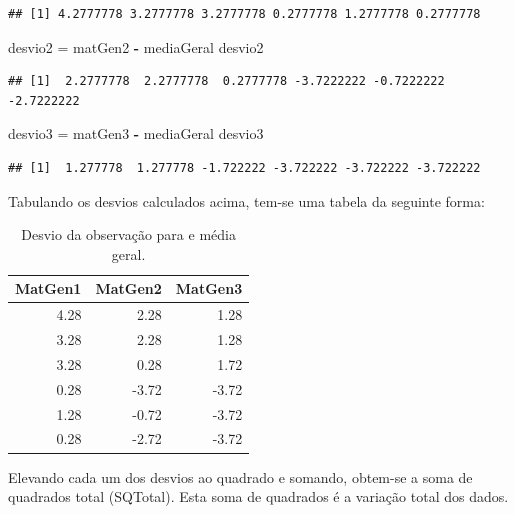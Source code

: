 \documentclass[
]{article}
\newenvironment{Shaded}{\begin{snugshade}}{\end{snugshade}}
\newcommand{\NormalTok}[1]{#1}
\newcommand{\OperatorTok}[1]{\textcolor[rgb]{0.81,0.36,0.00}{\textbf{#1}}}
\newcommand{\StringTok}[1]{\textcolor[rgb]{0.31,0.60,0.02}{#1}}
\begin{document}
\begin{verbatim}
## [1] 4.2777778 3.2777778 3.2777778 0.2777778 1.2777778 0.2777778
\end{verbatim}

\begin{Shaded}
\begin{Highlighting}[]
\NormalTok{desvio2 =}\StringTok{ }\NormalTok{matGen2 }\OperatorTok{-}\StringTok{ }\NormalTok{mediaGeral}
\NormalTok{desvio2}
\end{Highlighting}
\end{Shaded}

\begin{verbatim}
## [1]  2.2777778  2.2777778  0.2777778 -3.7222222 -0.7222222 -2.7222222
\end{verbatim}

\begin{Shaded}
\begin{Highlighting}[]
\NormalTok{desvio3 =}\StringTok{ }\NormalTok{matGen3 }\OperatorTok{-}\StringTok{ }\NormalTok{mediaGeral}
\NormalTok{desvio3}
\end{Highlighting}
\end{Shaded}

\begin{verbatim}
## [1]  1.277778  1.277778 -1.722222 -3.722222 -3.722222 -3.722222
\end{verbatim}

Tabulando os desvios calculados acima, tem-se uma tabela da seguinte forma:

\begin{table}

\caption{\label{tab:unnamed-chunk-16}Desvio da observação para e média geral.}
\centering
\begin{tabular}[t]{r|r|r}
\hline
MatGen1 & MatGen2 & MatGen3\\
\hline
4.28 & 2.28 & 1.28\\
\hline
3.28 & 2.28 & 1.28\\
\hline
3.28 & 0.28 & 1.72\\
\hline
0.28 & -3.72 & -3.72\\
\hline
1.28 & -0.72 & -3.72\\
\hline
0.28 & -2.72 & -3.72\\
\hline
\end{tabular}
\end{table}

Elevando cada um dos desvios ao quadrado e somando, obtem-se a soma de quadrados total (SQTotal). Esta soma de quadrados é a variação total dos dados.
\end{document}
